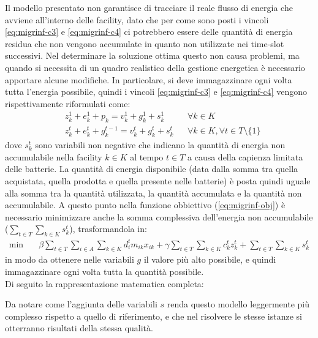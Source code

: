 Il modello presentato non garantisce di tracciare il reale flusso di energia che avviene all'interno delle facility, dato che per come sono posti i vincoli \ref{eq:migrinf-c3} e \ref{eq:migrinf-c4} ci potrebbero essere delle quantità di energia residua che non vengono accumulate in quanto non utilizzate nei time-slot successivi. Nel determinare la soluzione ottima questo non causa problemi, ma quando si necessita di un quadro realistico della gestione energetica è necessario apportare alcune modifiche. In particolare, si deve immagazzinare ogni volta tutta l'energia possibile, quindi i vincoli \ref{eq:migrinf-c3} e \ref{eq:migrinf-c4} vengono rispettivamente riformulati come:
\begin{align}
    \label{eq:statico-c3var}
    & z_k^1 + e_k^1 + p_k = v_k^1 + g_k^1 + s_k^1       &   & \forall k \in K                                  \\
    \label{eq:statico-c4var}
    & z_k^t + e_k^t + g_k^{t-1} = v_k^t + g_k^t + s_k^t &   & \forall k \in K, \forall t \in T \setminus \{1\}
\end{align}
\noindent
dove $s^t_k$ sono variabili non negative che indicano la quantità di energia non accumulabile nella facility $k \in K$ al tempo $t \in T$ a causa della capienza limitata delle batterie. La quantità di energia disponibile (data dalla somma tra quella acquistata, quella prodotta e quella presente nelle batterie) è posta quindi uguale alla somma tra la quantità utilizzata, la quantità accumulata e la quantità non accumulabile. A questo punto nella funzione obbiettivo (\ref{eq:migrinf-obj}) è necessario minimizzare anche la somma complessiva dell'energia non accumulabile ($\sum_{t \in T}\sum_{k \in K} s^t_k$), trasformandola in:
\begin{align}
    \label{eq:migrinf-objvar}
    \min\quad       & \beta \sum_{t \in T} \sum_{i \in A} \sum_{k \in K}{d^t_i m_{ik} x_{ik}} + \gamma \sum_{t \in T} \sum_{k \in K}{c_k^t z_k^t} + \sum_{t \in T} \sum_{k \in K}{s_k^t}
\end{align}
\noindent
in modo da ottenere nelle variabili $g$ il valore più alto possibile, e quindi immagazzinare ogni volta tutta la quantità possibile.\\
Di seguito la rappresentazione matematica completa:


Da notare come l'aggiunta delle variabili $s$ renda questo modello leggermente più complesso rispetto a quello di riferimento, e che nel risolvere le stesse istanze si otterranno risultati della stessa qualità.


